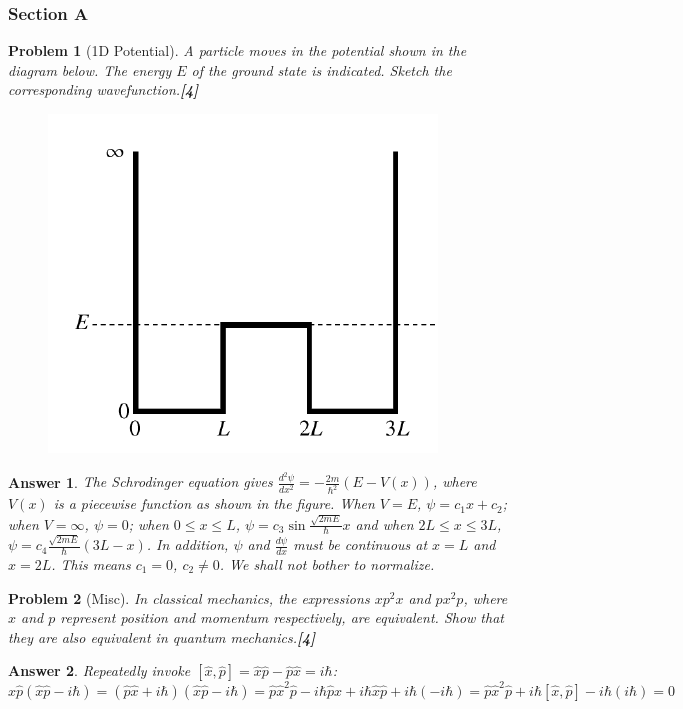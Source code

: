 \documentclass[a4paper]{article}
\newtheorem{ans}{Answer}[subsection]
\theoremstyle{new}
\newtheorem{qns}{Problem}[subsection]
\begin{document}
\subsubsection{Section A}
\begin{qns}[1D Potential]
A particle moves in the potential shown in the diagram below. The energy $E$ of the ground state is indicated. Sketch the corresponding wavefunction.\hfill\textbf{[4]}
\begin{figure}[H]
    \centering
    \includegraphics[scale=0.3]{2017P1A1Q.PNG}
\end{figure}
\end{qns}
\begin{ans}
The Schrodinger equation gives $\frac{d^2\psi}{dx^2}=-\frac{2m}{\hbar^2}(E-V(x))$, where $V(x)$ is a piecewise function as shown in the figure. When $V=E$, $\psi=c_1x+c_2$; when $V=\infty$, $\psi=0$; when $0\leq x\leq L$, $\psi=c_3\sin\frac{\sqrt{2mE}}{\hbar}x$ and when $2L\leq x\leq 3L$, $\psi=c_4\frac{\sqrt{2mE}}{\hbar}(3L-x)$. In addition, $\psi$ and $\frac{d\psi}{dx}$ must be continuous at $x=L$ and $x=2L$. This means $c_1=0$, $c_2\neq 0$. We shall not bother to normalize.
\end{ans}
\begin{qns}[Misc]
In classical mechanics, the expressions $xp^2x$ and $px^2p$, where $x$ and $p$ represent position and momentum respectively, are equivalent. Show that they are also equivalent in quantum mechanics.\hfill\textbf{[4]}
\end{qns}
\begin{ans}
Repeatedly invoke $[\hat{x},\hat{p}]=\hat{x}\hat{p}-\hat{p}\hat{x}=i\hbar$:
$$\hat{x}\hat{p}(\hat{x}\hat{p}-i\hbar)=(\hat{p}\hat{x}+i\hbar)(\hat{x}\hat{p}-i\hbar)=\hat{p}\hat{x}^2\hat{p}-i\hbar\hat{p}\hat{x}+i\hbar\hat{x}\hat{p}+i\hbar(-i\hbar)=\hat{p}\hat{x}^2\hat{p}+i\hbar[\hat{x},\hat{p}]-i\hbar(i\hbar)=0$$
\end{ans}
\end{document}
